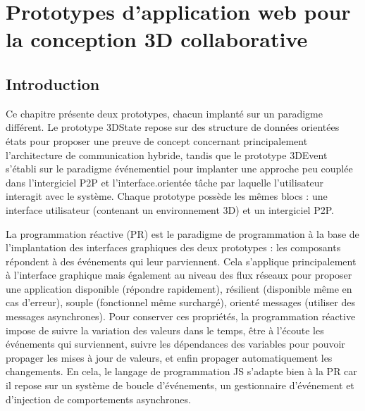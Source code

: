 \chapter{Prototypes d'application web pour la conception 3D collaborative}
\chaptertable

\section{Introduction}
Ce chapitre présente deux prototypes, chacun implanté sur un paradigme différent.
Le prototype 3DState repose sur des structure de données orientées états pour 
proposer une preuve de concept concernant principalement l'architecture de 
communication hybride, tandis que le prototype 3DEvent s'établi sur le paradigme 
événementiel pour implanter une approche peu couplée dans l'intergiciel \gls{P2P} 
et l'interface.orientée tâche par laquelle l'utilisateur interagit avec le système.
Chaque prototype possède les mêmes blocs : une interface utilisateur (contenant 
un environnement 3D) et un intergiciel \gls{P2P}.



La programmation réactive (PR) est le paradigme de programmation à la base de 
l'implantation des interfaces graphiques des deux prototypes : les composants 
répondent à des événements qui leur parviennent. 
Cela s'applique principalement à l'interface graphique mais 
également au niveau des flux réseaux pour proposer une application disponible 
(répondre rapidement), résilient (disponible même en cas d'erreur), souple 
(fonctionnel même surchargé), orienté messages (utiliser des messages 
asynchrones). Pour conserver ces propriétés, la programmation réactive impose 
de suivre la variation des valeurs dans le temps, être à l'écoute les événements 
qui surviennent, suivre les dépendances des variables pour pouvoir propager les 
mises à jour de valeurs, et enfin propager automatiquement les changements.
En cela, le langage de programmation \gls{JS} s'adapte bien à la PR car il repose 
sur un système de boucle d'événements, un gestionnaire d'événement et 
d'injection de comportements asynchrones. 

